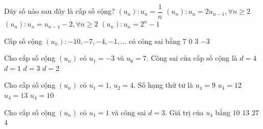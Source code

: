 \begin{ex}%
	Dãy số nào sau đây là cấp số cộng?
	\choice
	{$(u_n) \colon u_n=\dfrac{1}{n}$}
	{$(u_n) \colon u_n=2u_{n-1},\forall n \ge 2$}
	{\True $(u_n) \colon u_n=u_{n-1}-2,\forall n \ge 2$}
	{$(u_n) \colon u_n=2^n-1$}
\end{ex}

\begin{ex}%
	Cấp số cộng $(u_n)\colon -10, -7, -4, -1, \ldots$ có công sai bằng
	\choice
	{$7$}
	{$0$}
	{\True $3$}
	{$-3$}
\end{ex}

\begin{ex}%
	Cho cấp số cộng $\left(u_n\right)$ có $u_1=-3$ và $u_6=7$. Công sai của cấp số cộng là
	\choice
	{$d=4$}
	{$d=1$}
	{$d=3$}
	{\True $d=2$}
\end{ex}

\begin{ex}%
	Cho cấp số cộng $(u_n)$ có $u_1 = 1$, $u_2 = 4$. Số hạng thứ tư là
	\choice
	{$u_4 = 9$}
	{$u_4 = 12$}
	{$u_4 = 13$}
	{\True $u_4 = 10$}
\end{ex}

\begin{ex}%
	Cho cấp số cộng $(u_n)$ có $u_1=1$ và công sai $d=3$. Giá trị của $u_4$ bằng
	\choice
	{\True $10$}
	{$13$}
	{$27$}
	{$4$}
\end{ex}

